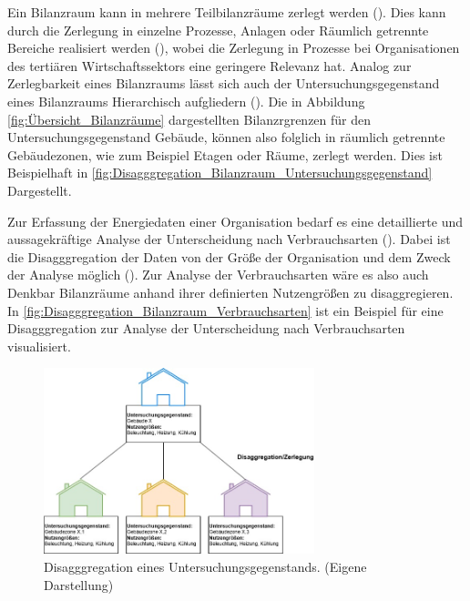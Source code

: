 Ein Bilanzraum kann in mehrere Teilbilanzräume zerlegt werden (\cite[S. 310]{Engelmann.2015}). Dies kann durch die Zerlegung in einzelne Prozesse, 
Anlagen oder Räumlich getrennte Bereiche realisiert werden (\cite[S. 310]{Engelmann.2015}), wobei die Zerlegung in Prozesse bei Organisationen des tertiären 
Wirtschaftssektors eine geringere Relevanz hat.
Analog zur Zerlegbarkeit eines Bilanzraums lässt sich auch der Untersuchungsgegenstand eines Bilanzraums Hierarchisch aufgliedern (\cite[S. 109]{Miller.2016}).
Die in Abbildung \eqref{fig:Übersicht_Bilanzräume} dargestellten Bilanzrgrenzen für den Untersuchungsgegenstand Gebäude, können also folglich 
in räumlich getrennte Gebäudezonen, wie zum Beispiel Etagen oder Räume, zerlegt werden. Dies ist Beispielhaft in \eqref{fig:Disagggregation_Bilanzraum_Untersuchungsgegenstand} 
Dargestellt.  

Zur Erfassung der Energiedaten einer Organisation bedarf es eine detaillierte und aussagekräftige Analyse der Unterscheidung nach Verbrauchsarten 
(\cite[S. 14]{Hohnhold.2013}). Dabei ist die Disagggregation der Daten von der Größe der Organisation und dem Zweck der Analyse möglich (\cite[S. 14f.]{Hohnhold.2013}).
Zur Analyse der Verbrauchsarten wäre es also auch Denkbar Bilanzräume anhand ihrer definierten Nutzengrößen zu disaggregieren. 
In \eqref{fig:Disagggregation_Bilanzraum_Verbrauchsarten} ist ein Beispiel für eine Disagggregation zur Analyse der Unterscheidung nach Verbrauchsarten visualisiert.


\begin{figure}[H]
    \centering
    \includegraphics[width=0.7\textwidth]{../../Ressourcen/Abbildungen/Untersuchungsgegenstand_Zerlegt.jpg}
    \caption{Disagggregation eines Untersuchungsgegenstands. (Eigene Darstellung)}
    \label{fig:Disagggregation_Bilanzraum_Untersuchungsgegenstand}
\end{figure}

